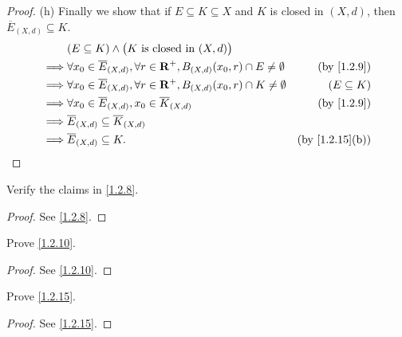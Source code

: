 \begin{proof}{(h)}
  Finally we show that if \(E \subseteq K \subseteq X\) and \(K\) is closed in \((X, d)\), then \(\overline{E}_{(X, d)} \subseteq K\).
  \begin{align*}
             & (E \subseteq K) \land \big(K \text{ is closed in } (X, d)\big)                                                                     \\
    \implies & \forall x_0 \in \overline{E}_{(X, d)}, \forall r \in \R^+, B_{(X, d)}(x_0, r) \cap E \neq \emptyset & \text{(by \cref{1.2.9})}     \\
    \implies & \forall x_0 \in \overline{E}_{(X, d)}, \forall r \in \R^+, B_{(X, d)}(x_0, r) \cap K \neq \emptyset & (E \subseteq K)              \\
    \implies & \forall x_0 \in \overline{E}_{(X, d)}, x_0 \in \overline{K}_{(X, d)}                                & \text{(by \cref{1.2.9})}     \\
    \implies & \overline{E}_{(X, d)} \subseteq \overline{K}_{(X, d)}                                                                              \\
    \implies & \overline{E}_{(X, d)} \subseteq K.                                                                  & \text{(by \cref{1.2.15}(b))}
  \end{align*}
\end{proof}

\exercisesection

\begin{exercise}\label{ex 1.2.1}
  Verify the claims in \cref{1.2.8}.
\end{exercise}

\begin{proof}
  See \cref{1.2.8}.
\end{proof}

\begin{exercise}\label{ex 1.2.2}
  Prove \cref{1.2.10}.
\end{exercise}

\begin{proof}
  See \cref{1.2.10}.
\end{proof}

\begin{exercise}\label{ex 1.2.3}
  Prove \cref{1.2.15}.
\end{exercise}

\begin{proof}
  See \cref{1.2.15}.
\end{proof}

